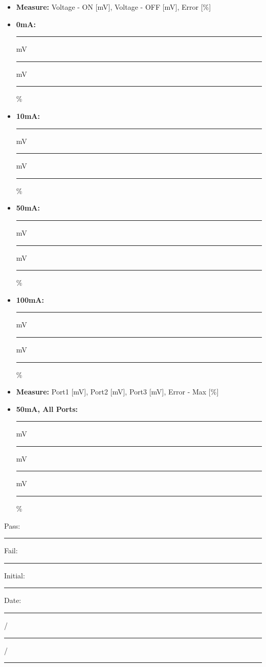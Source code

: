 \begin{itemize}
\item \textbf{Measure:} Voltage - ON [mV], Voltage - OFF [mV], Error [\%]
\item \textbf{0mA:} \rule{2cm}{0.15mm} mV \hspace{0.5cm} \rule{2cm}{0.15mm} mV \hspace{0.5cm} \rule{2cm}{0.15mm} \%
\item \textbf{10mA:} \rule{2cm}{0.15mm} mV \hspace{0.5cm} \rule{2cm}{0.15mm} mV \hspace{0.5cm} \rule{2cm}{0.15mm} \%
\item \textbf{50mA:} \rule{2cm}{0.15mm} mV \hspace{0.5cm} \rule{2cm}{0.15mm} mV \hspace{0.5cm} \rule{2cm}{0.15mm} \%
\item \textbf{100mA:} \rule{2cm}{0.15mm} mV \hspace{0.5cm} \rule{2cm}{0.15mm} mV \hspace{0.5cm} \rule{2cm}{0.15mm} \%
\item \textbf{Measure:} Port1 [mV], Port2 [mV], Port3 [mV], Error - Max [\%]
\item \textbf{50mA, All Ports:} \rule{2cm}{0.15mm} mV \hspace{0.5cm} \rule{2cm}{0.15mm} mV \hspace{0.5cm} \rule{2cm}{0.15mm} mV \hspace{0.5cm} \rule{2cm}{0.15mm} \%
\end{itemize}


\vfill

{\large Pass: \rule{1cm}{0.15mm} \hspace{1cm} Fail: \rule{1cm}{0.15mm}} \hfill Initial: \rule{2cm}{0.15mm} \hspace{1cm} Date: \rule{0.5cm}{0.15mm}/\rule{0.5cm}{0.15mm}/\rule{1cm}{0.15mm}\\[5pt]

\pagebreak

